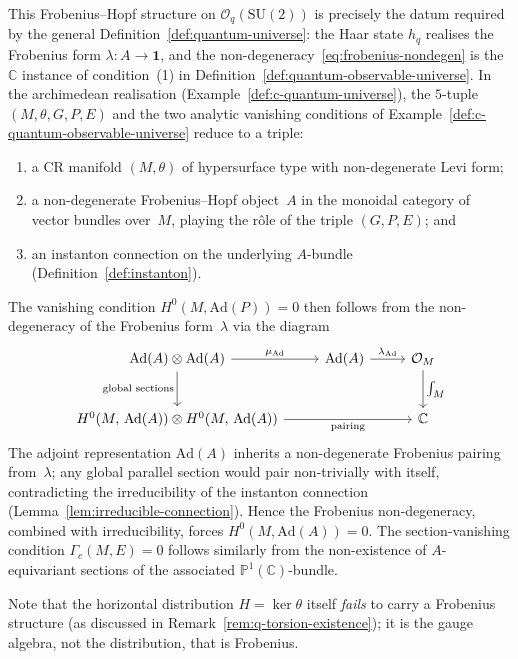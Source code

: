 \begin{remark}
This Frobenius--Hopf structure on $\mathcal{O}_q(\mathrm{SU}(2))$ is
precisely the datum required by the general
Definition~\ref{def:quantum-universe}: the Haar state $h_q$ realises
the Frobenius form $\lambda \colon A \to \mathbf{1}$, and the
non-degeneracy~\eqref{eq:frobenius-nondegen} is the $\mathbb{C}$
instance of condition~(1) in
Definition~\ref{def:quantum-observable-universe}.
In the archimedean realisation (Example~\ref{def:c-quantum-universe}),
the $5$-tuple $(M, \theta, G, P, E)$ and the two analytic vanishing
conditions of Example~\ref{def:c-quantum-observable-universe}
reduce to a triple:
\begin{enumerate}
  \item a CR manifold $(M, \theta)$ of hypersurface type with
        non-degenerate Levi form;
  \item a non-degenerate Frobenius--Hopf object~$A$ in the monoidal
        category of vector bundles over~$M$, playing the r\^ole of the
        triple $(G, P, E)$; and
  \item an instanton connection on the underlying $A$-bundle
        (Definition~\ref{def:instanton}).
\end{enumerate}
The vanishing condition $H^0(M, \mathrm{Ad}(P)) = 0$ then follows from
the non-degeneracy of the Frobenius form~$\lambda$ via the diagram
\begin{equation}\label{eq:frobenius-vanishing}
\begin{tikzcd}[row sep=2.5em, column sep=2.5em]
  \mathrm{Ad}(A) \otimes \mathrm{Ad}(A)
    \ar[r, "\mu_{\mathrm{Ad}}"]
    \ar[d, "\text{global sections}"']
  & \mathrm{Ad}(A)
    \ar[r, "\lambda_{\mathrm{Ad}}"]
  & \mathcal{O}_M
    \ar[d, "\textstyle\int_M"]
  \\
  H^0(M,\,\mathrm{Ad}(A)) \otimes H^0(M,\,\mathrm{Ad}(A))
    \ar[rr, "\text{pairing}"']
  & & \mathbb{C}
\end{tikzcd}
\end{equation}
The adjoint representation $\mathrm{Ad}(A)$ inherits a non-degenerate
Frobenius pairing from~$\lambda$; any global parallel section would
pair non-trivially with itself, contradicting the irreducibility of
the instanton connection
(Lemma~\ref{lem:irreducible-connection}).  Hence the Frobenius
non-degeneracy, combined with irreducibility, forces
$H^0(M, \mathrm{Ad}(A)) = 0$.  The section-vanishing condition
$\Gamma_c(M, E) = 0$ follows similarly from the non-existence of
$A$-equivariant sections of the associated $\mathbb{P}^1(\mathbb{C})$-bundle.

Note that the horizontal distribution $H = \ker\theta$ itself
\emph{fails} to carry a Frobenius structure (as discussed in
Remark~\ref{rem:q-torsion-existence}); it is the gauge algebra, not the
distribution, that is Frobenius.
\end{remark}

